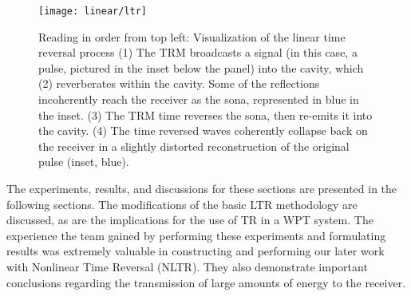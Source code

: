 \begin{figure}[]
\centering
\texttt{[image: linear/ltr]}
    \caption[Conceptual overview of linear time reversal]{Reading in order from top left: Visualization of the linear time reversal process (1) The TRM broadcasts a signal (in this case, a pulse, pictured in the inset below the panel) into the cavity, which (2) reverberates within the cavity. Some of the reflections incoherently reach the receiver as the sona, represented in blue in the inset. (3) The TRM time reverses the sona, then re-emits it into the cavity. (4) The time reversed waves coherently collapse back on the receiver in a slightly distorted reconstruction of the original pulse (inset, blue).}
    \label{fig:linear-ltr}
\end{figure}

The experiments, results, and discussions for these sections are presented in the following sections. The modifications of the basic LTR methodology are discussed, as are the implications for the use of TR in a WPT system. The experience the team gained by performing these experiments and formulating results was extremely valuable in constructing and performing our later work with Nonlinear Time Reversal (NLTR). They also demonstrate important conclusions regarding the transmission of large amounts of energy to the receiver.
